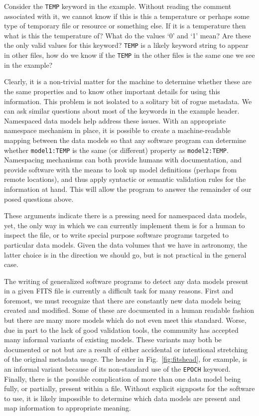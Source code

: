 \documentclass[final,authoryear,5p,times,twocolumn]{elsarticle}
\begin{document}
{{Consider the \texttt{TEMP} keyword in the example. Without reading the comment
associated with it, we cannot know if this is this a temperature or perhaps
some type of temporary file or resource or something else. If it is a
temperature then what is this the temperature of? What do the values `0'
and `1' mean? Are these the only valid values for this keyword?  \texttt{TEMP} is
a likely keyword string to appear in other files, how do we know if the
\texttt{TEMP} in the other files is the same one we see in the example?


Clearly, it is a non-trivial matter for the machine to determine whether
these are the same properties and to know other important details for using
this information. This problem is not isolated to a solitary bit
of rogue metadata. We can ask similar questions about most of the keywords
in the example header. Namespaced data models help address these issues. With
an appropriate namespace mechanism in place, it is possible to create a
machine-readable mapping between the data models so that any software program
can determine whether \texttt{model1:TEMP} is the same (or different) property as
\texttt{model2:TEMP}.
Namespacing mechanisms can both provide humans with documentation, and
provide software with the means to look up model definitions (perhaps from
remote locations), and thus apply syntactic or semantic validation rules
for the information at hand.  This will allow the program to
answer the remainder of our posed questions above.


These arguments indicate there is a pressing need for name\-spaced data models,
yet, the only way in which we can currently implement them is for a human
to inspect the file, or to write special purpose software programs targeted to
particular data models. Given the data volumes that we have in astronomy, the
latter choice is in the direction we should go, but is not practical
in the general case.


The writing of generalized software programs to detect any data models
present in a given FITS file is currently a difficult task for many reasons.
First and foremost, we must recognize that there are constantly new data models
being created and modified. Some of these are documented in a human readable
fashion but there are many more models which do not even meet this standard.
Worse, due in part to the lack of good validation tools, the community has
accepted many informal variants of existing models. These variants may both
be documented or not but are a result of either accidental or intentional
stretching of the original metadata usage. The header in
Fig.~\ref{fig:fitshead}, for example, is an informal variant because of its non-standard
use of the \texttt{EPOCH} keyword.
Finally, there is the possible complication of more than one data model being
fully, or partially, present within a file. Without explicit signposts for
the software to use, it is likely impossible to determine which data models
are present and map information to appropriate meaning.


}}
\end{document}
